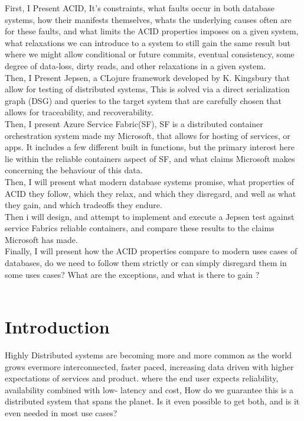 \documentclass[a4paper,10pt,titlepage]{report}
\begin{document}
First, I Present ACID, It's constraints, what faults occur in both database systems, how their manifests themselves, whats the underlying causes often are for these faults, and what limits the ACID properties imposes on a given system, what relaxations we can introduce to a system to still gain the same result but where we might allow conditional or future commits, eventual consistency, some degree of data-loss, dirty reads, and other relaxations in a given system.\\

Then, I Present Jepsen, a CLojure framework\cite{Jepsen} developed by K. Kingsbury that allow for testing of distributed systems, This is solved via a direct serialization graph (DSG) and queries to the target system that are carefully chosen that allows for traceability, and recoverability.  \\


Then, I present Azure Service Fabric(SF), SF is a distributed container orchestration system made my Microsoft, that allows for hosting of services, or apps. It includes a few different built in functions, but the primary interest here lie within the reliable containers aspect of SF, and what claims Microsoft makes concerning the behaviour of this data.\\

Then, I will present what modern database systems promise, what properties of ACID they follow, which they relax, and which they disregard, and well as what they gain, and which tradeoffs they endure.\\

Then i will design, and attempt to implement and execute a Jepsen test against service Fabrics reliable containers, and compare these results to the claims Microsoft has made.\\

Finally, I will present how the ACID properties compare to modern uses cases of databases, do we need to follow them strictly or can simply disregard them in some uses cases? What are the exceptions, and what is there to gain ?\\
\\



\chapter{Introduction}

Highly Distributed systems are becoming more and more common as the world grows evermore interconnected, faster paced, increasing data driven with higher expectations of services and product. where the end user expects reliability, availability combined with low- latency and cost, How do we guarantee this is a distributed system that spans the planet. Is it even possible to get both, and is it even needed in most use cases?\\
\end{document}
